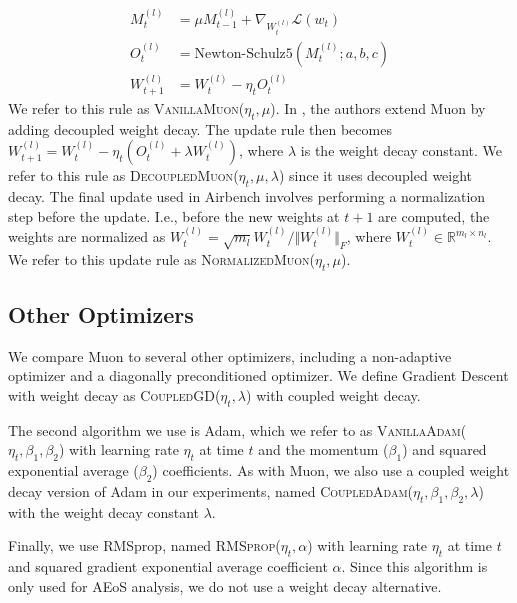 \documentclass{article}
\theoremstyle{plain}
\theoremstyle{definition}
\theoremstyle{remark}
\begin{document}
\begin{equation}
\begin{aligned}
    M_{t}^{(l)} &= \mu M_{t-1}^{(l)} + \nabla_{W_t^{(l)}} \mathcal{L}(w_t) \\
    O_{t}^{(l)} &= \text{Newton-Schulz5}(M_{t}^{(l)}; a, b, c) \\
    W_{t+1}^{(l)} &= W_t^{(l)} - \eta_t O_{t}^{(l)}
\end{aligned}
\end{equation}
We refer to this rule as \textsc{VanillaMuon}($\eta_t, \mu$). In \citet{liu2025muonscalableLLM}, the authors extend Muon by adding decoupled weight decay. The update rule then becomes $W_{t+1}^{(l)} = W_t^{(l)} - \eta_t(O_t^{(l)} + \lambda W_t^{(l)})$, where $\lambda$ is the weight decay constant. We refer to this rule as \textsc{DecoupledMuon}($\eta_t, \mu, \lambda$) since it uses decoupled weight decay. The final update used in Airbench \citet{jordan2024airbench} involves performing a normalization step before the update. I.e., before the new weights at $t+1$ are computed, the weights are normalized as $W_t^{(l)} = \sqrt{m_l}W_t^{(l)} / \Vert W_t^{(l)}\Vert_F$, where $W_t^{(l)} \in \mathbb{R}^{m_l \times n_l}$. We refer to this update rule as \textsc{NormalizedMuon}($\eta_t, \mu$).

\subsection{Other Optimizers}

We compare Muon to several other optimizers, including a non-adaptive optimizer and a diagonally preconditioned optimizer. We define Gradient Descent with weight decay as \textsc{CoupledGD}($\eta_t, \lambda$) with coupled weight decay.

The second algorithm we use is Adam, which we refer to as \textsc{VanillaAdam}($\eta_t, \beta_1, \beta_2$) with learning rate $\eta_t$ at time $t$ and the momentum ($\beta_1$) and squared exponential average ($\beta_2$) coefficients. As with Muon, we also use a coupled weight decay version of Adam in our experiments, named \textsc{CoupledAdam}($\eta_t, \beta_1, \beta_2, \lambda$) with the weight decay constant $\lambda$.

Finally, we use RMSprop, named \textsc{RMSprop}($\eta_t, \alpha$) with learning rate $\eta_t$ at time $t$ and squared gradient exponential average coefficient $\alpha$. Since this algorithm is only used for AEoS analysis, we do not use a weight decay alternative.


\end{document}

